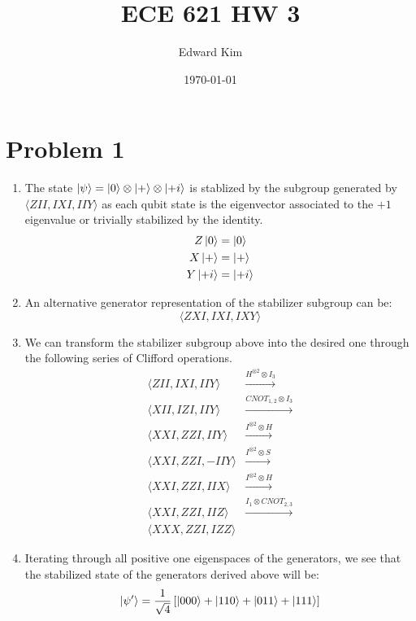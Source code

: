 \documentclass[12pt]{article}%
\begin{document}
\title{ECE 621 HW 3}
\author{Edward Kim}
\date{\today}
\maketitle

\section*{Problem 1}
\begin{enumerate}
	\item The state $\ket{\psi} = \ket{0} \otimes \ket{+} \otimes \ket{+i}$
		is stablized by the subgroup generated by $\langle ZII, IXI, IIY \rangle$ as each qubit state is the eigenvector associated to the $+1$ eigenvalue or trivially stabilized by the identity.
		\begin{align*}
			\label{eq:}
			Z \ket{0}  &= \ket{0} \\
			X \ket{+} &= \ket{+} \\
			Y \ket{+i} &= \ket{+i}
		\end{align*}
	\item An alternative generator representation of the stabilizer subgroup can be:
		\begin{equation*}
			\langle ZXI, IXI, IXY \rangle
		\end{equation*}
	\item We can transform the stabilizer subgroup above into the desired one through the following series of Clifford operations.
		\begin{align*}
			\langle ZII, IXI, IIY \rangle & \xrightarrow{H^{\otimes 2} \otimes I_3} \\
			\langle XII, IZI, IIY \rangle & \xrightarrow{CNOT_{1,2} \otimes I_3} \\	
			\langle XXI, ZZI, IIY \rangle & \xrightarrow{I^{\otimes 2} \otimes H} \\
			\langle XXI, ZZI, -IIY \rangle & \xrightarrow{I^{\otimes 2} \otimes S} \\
			\langle XXI, ZZI, IIX \rangle & \xrightarrow{I^{\otimes 2} \otimes H} \\
			\langle XXI, ZZI, IIZ \rangle & \xrightarrow{I_1 \otimes CNOT_{2,3}} \\
			\langle XXX, ZZI, IZZ \rangle
		\end{align*}

	\item Iterating through all positive one eigenspaces of the generators, we see that the stabilized state of the generators derived above will be:
		\begin{equation*}
			\ket{\psi'} = \frac{1}{\sqrt{4}} \left[ \ket{000} + \ket{110} + \ket{011} + \ket{111} \right]
		\end{equation*}
\end{enumerate}
\end{document}
